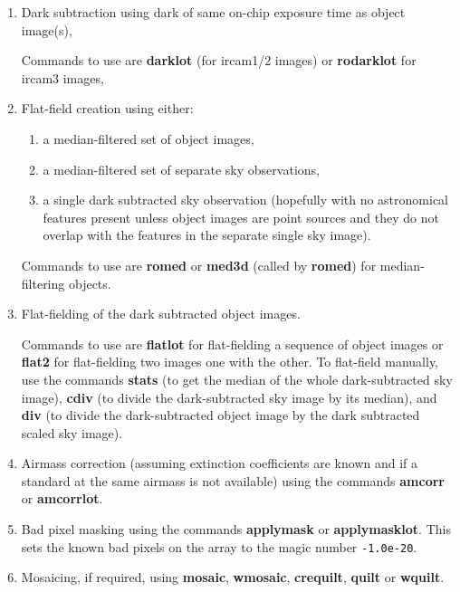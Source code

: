 \begin{enumerate}

\item Dark subtraction using dark of same on-chip exposure time as
object image(s), 

Commands to use are {\bf darklot} (for {\sc ircam1/2}
images) or {\bf rodarklot} for {\sc ircam3} images,

\item Flat-field creation using either:

\begin{enumerate}

\item a median-filtered set of object images, 
\item a median-filtered set of separate sky observations,
\item a single dark subtracted sky observation (hopefully with no
astronomical features present unless object images are point sources
and they do not overlap with the features in the separate single sky
image).  

\end{enumerate}

Commands to use are {\bf romed} or {\bf med3d} (called by {\bf
romed}) for median-filtering objects.

\item Flat-fielding of the dark subtracted object images. 

Commands to
use are {\bf flatlot} for flat-fielding a sequence of object images or
{\bf flat2} for flat-fielding two images one with the other.  To flat-field
manually, use the commands {\bf stats} (to get the median of the whole dark-subtracted sky image), {\bf cdiv} (to divide the dark-subtracted sky image by
its median), and {\bf div} (to divide the dark-subtracted object image by the
dark subtracted scaled sky image).

\item Airmass correction (assuming extinction coefficients are known
and if a standard at the same airmass is not available) using the
commands {\bf amcorr} or {\bf amcorrlot}.

\item Bad pixel masking using the commands {\bf applymask} or {\bf
applymasklot}.  This sets the known bad pixels on the array to the
magic number {\tt -1.0e-20}.

\item Mosaicing, if required, using {\bf mosaic}, {\bf wmosaic}, {\bf
crequilt}, {\bf quilt} or {\bf wquilt}.

\end{enumerate}

